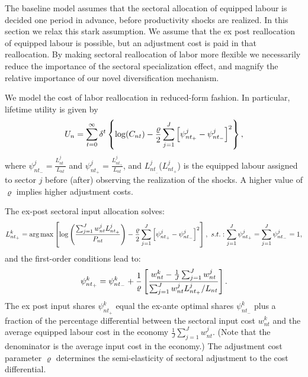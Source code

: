 \documentclass[12pt]{article}
\begin{document}
The baseline model assumes that the sectoral allocation of equipped labour
is decided one period in advance, before productivity shocks are realized.
In this section we relax this stark assumption. We assume that the ex post
reallocation of equipped labour is possible, but an adjustment cost is paid
in that reallocation. By making sectoral reallocation of labor more flexible
we necessarily reduce the importance of the sectoral specialization effect,
and magnify the relative importance of our novel diversification mechanism.

We model the cost of labor reallocation in reduced-form fashion. In
particular, lifetime utility is given by 
\begin{equation}
U_{n}=\sum\limits_{t=0}^{\infty }\delta ^{t}\left\{ \log (C_{nt})-\frac{%
\varrho }{2}\sum_{j=1}^{J}\left[ \psi _{nt_{+}}^{j}-\psi _{nt_{-}}^{j}\right]
^{2}\right\} ,  \label{AC}
\end{equation}%
where $\psi _{nt_{-}}^{j}=\frac{L_{nt_{_{-}}}^{j}}{L_{nt}}$ and $\psi
_{nt_{+}}^{j}=\frac{L_{nt_{+}}^{j}}{L_{nt}}$, and $L_{nt_{_{-}}}^{j}$($%
L_{nt_{+}}^{j}$) is the equipped labour assigned to sector $j$ before
(after) observing the realization of the shocks. A higher value of $\varrho $
implies higher adjustment costs.

The ex-post sectoral input allocation solves:%
\begin{equation*}
L_{nt_{+}}^{k}=\arg \max \left[ \log \left( \frac{%
\sum_{j=1}^{J}w_{nt}^{j}L_{nt_{+}}^{j}}{P_{nt}}\right) -\frac{\varrho }{2}%
\sum_{j=1}^{J}\left[ \psi _{nt_{+}}^{j}-\psi _{nt_{-}}^{j}\right] ^{2}\right]
,\text{ }s.t.:\sum_{j=1}^{J}\psi _{nt_{+}}^{j}=\sum_{j=1}^{J}\psi
_{nt_{-}}^{j}=1,
\end{equation*}%
and the first-order conditions lead to:%
\begin{equation}
\psi _{nt_{+}}^{k}=\psi _{nt_{-}}^{k}+\frac{1}{\varrho }\left[ \frac{%
w_{nt}^{k}-\frac{1}{J}\sum_{j=1}^{J}w_{nt}^{j}}{%
\sum_{j=1}^{J}w_{nt}^{j}L_{nt_{+}}^{j}/L_{nt}}\right] .  \label{estimate}
\end{equation}%
The ex post input shares $\psi _{nt_{+}}^{k}$ equal the ex-ante optimal
shares $\psi _{nt_{-}}^{k}$ plus a fraction of the percentage differential
between the sectoral input cost $w_{nt}^{k}$ and the average equipped labour
cost in the economy $\frac{1}{J}\sum_{j=1}^{J}w_{nt}^{j}$. (Note that the
denominator is the average input cost in the economy.) The adjustment cost
parameter $\varrho $ determines the semi-elasticity of sectoral adjustment
to the cost differential.
\end{document}

